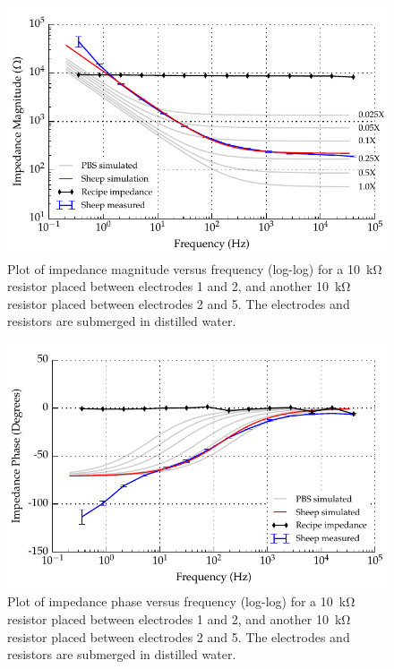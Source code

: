 \begin{figure}
    \centering
    \includegraphics[width=\textwidth]{content/appendices/Solution-Impedance-Measurements/graphics/run14_calibration_10k_water_ZVsF_graph_mag}
    \caption{\label{fig:calibration_10kRes_water_mag}Plot of impedance magnitude versus frequency (log-log) for a \SI{10}{\kilo\ohm} resistor placed between electrodes 1 and 2, and another \SI{10}{\kilo\ohm} resistor placed between electrodes 2 and 5. The electrodes and resistors are submerged in distilled water.}
\end{figure}

\begin{figure}
    \centering
    \includegraphics[width=\textwidth]{content/appendices/Solution-Impedance-Measurements/graphics/run14_calibration_10k_water_ZVsF_graph_phase}
    \caption{\label{fig:calibration_10kRes_water_phase}Plot of impedance phase versus frequency (log-log) for a \SI{10}{\kilo\ohm} resistor placed between electrodes 1 and 2, and another \SI{10}{\kilo\ohm} resistor placed between electrodes 2 and 5. The electrodes and resistors are submerged in distilled water.}
\end{figure}

